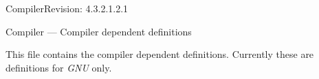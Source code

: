 %
%
% 
% 
% 
% 
%

\begin{manpage}{\libtitle}{Compiler}{$ $Revision: 4.3.2.1.2.1 $ $}

\subtitle{Name}
    Compiler --- Compiler dependent definitions


\subtitle{Description}
    This file contains the compiler dependent definitions. Currently these are
    definitions for \emph{GNU \CC} only.


\subtitle{Declaration}


\subtitle{Revision}

\end{manpage}
